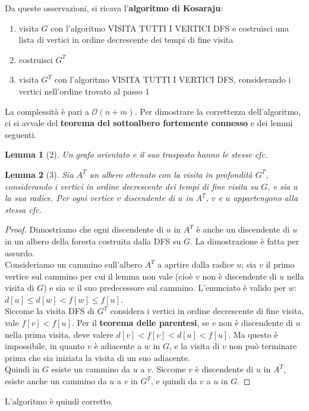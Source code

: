 \documentclass[11pt]{article}
\newtheorem*{lemma}{Lemma}
\begin{document}
Da queste osservazioni, si ricava l'\textbf{algoritmo di Kosaraju}: 
\begin{enumerate}
    \item visita $G$ con l'algoritmo VISITA TUTTI I VERTICI DFS e costruisci una lista di vertici in ordine decrescente 
    dei tempi di fine visita 
    \item costruisci $G^T$
    \item visita $G^T$ con l'algoritmo VISITA TUTTI I VERTICI DFS, considerando i vertici nell'ordine trovato al passo 1 
\end{enumerate}
La complessità è pari a $\mathcal{O}(n+m)$.
Per dimostrare la correttezza dell'algoritmo, ci si avvale del \textbf{teorema del sottoalbero fortemente connesso} e dei 
lemmi seguenti.
\begin{lemma}[2]
    Un grafo orientato e il suo trasposto hanno le stesse cfc.
\end{lemma}
\begin{lemma}[3]
    Sia $A^T$ un albero ottenuto con la visita in profondità $G^T$, considerando i vertici in ordine decrescente dei tempi 
    di fine visita su $G$, e sia $u$ la sua radice. Per ogni vertice $v$ discendente di $u$ in $A^T$, $v$ e $u$ appartengono 
    alla stessa cfc.
\end{lemma}
\begin{proof}
    Dimostriamo che ogni discendente di $u$ in $A^T$ è anche un discendente di $u$ in un albero della foresta costruita 
    dalla DFS su $G$. La dimostrazione è fatta per assurdo.\\
    Consideriamo un cammino sull'albero $A^T$ a aprtire dalla radice $u$; sia $v$ il primo vertice sul cammino per cui il 
    lemma non vale (cioè $v$ non è discendente di $u$ nella visita di $G$) e sia $w$ il suo predecessore sul cammino. 
    L'enunciato è valido per $w$: $d[u]\leq d[w]<f[w]\leq f[u]$.\\
    Siccome la visita DFS di $G^T$ considera i vertici in ordine decrescente di fine visita, vale $f[v]<f[u]$.
    Per il \textbf{teorema delle parentesi}, se $v$ non è discendente di $u$ nella prima visita, deve valere $d[v]<f[v]<d[u]<f[u]$.
    Ma questo è impossibile, in quanto $v$ è adiacente a $w$ in $G$, e la visita di $v$ non può terminare prima che sia 
    iniziata la visita di un suo adiacente.\\
    Quindi in $G$ esiste un cammino da $u$ a $v$. Siccome $v$ è discendente di $u$ in $A^T$, esiste anche un cammino da 
    $u$ a $v$ in $G^T$, e quindi da $v$ a $u$ in $G$.
\end{proof}
L'algoritmo è quindi corretto.
\end{document}

